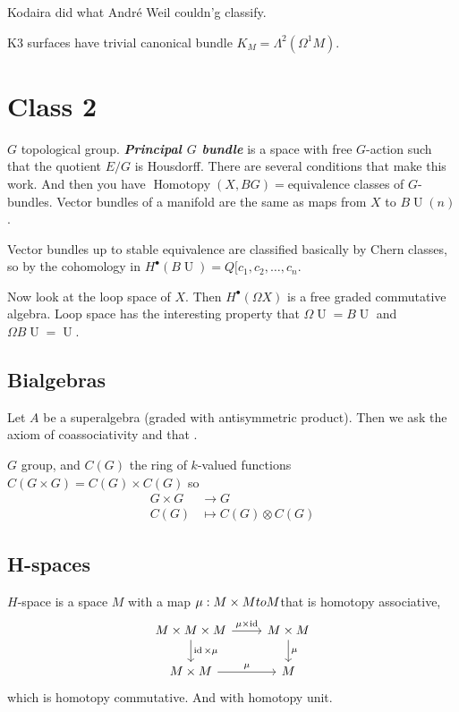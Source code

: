 Kodaira did what Andr\'e Weil couldn'g classify.

 \begin{thm}
	K3 surfaces have trivial canonical bundle $K_{M}=\Lambda^2(\Omega^1M)$.
\end{thm}

\section{Class 2}

$G$ topological group. \textit{\textbf{Principal $G$ bundle}} is a space with free $G$-action such that the quotient $E/G$ is Housdorff. There are several conditions that make this work. And then you have $\operatorname{Homo t o py}(X,BG)=$equivalence classes of $G$-bundles.
Vector bundles of a manifold are the same as maps from $X$ to $B\operatorname{U}(n)$.

Vector bundles up to stable equivalence are classified basically by Chern classes, so by the cohomology in $H^\bullet(B\operatorname{U})=Q[c_1,c_2,\ldots,c_n$.

Now look at the loop space of $X$. Then $H^{\bullet}(\Omega X)$ is a free graded commutative algebra. Loop space has the interesting property that $\Omega \operatorname{U}=B\operatorname{U}$ and $\Omega B\operatorname{U}=\operatorname{U}$.

\subsection{Bialgebras}

Let $A$ be a superalgebra (graded with antisymmetric product). Then we ask the axiom of coassociativity and that .

\begin{example}
	$G$ group, and $C(G)$ the ring of  $k$-valued functions $C(G\times G)=C(G)\times C(G)$ so
	\begin{align*}
		G\times G &\longrightarrow G \\
		C(G) &\longmapsto C(G)\otimes C(G)
	\end{align*}
	
\end{example}

\subsection{H-spaces}

\begin{defn}
	$H$-space is a space $M$ with a map $\mu:M\times M\\to M$that is homotopy associative,
	\[\begin{tikzcd}
		M\times M\times M\arrow[r,"\mu\times \operatorname{id}"]\arrow[d,"\operatorname{id}\times \mu"]&M\times M\arrow[d,"\mu"]\\
		M\times M\arrow[r,"\mu"]&M
	\end{tikzcd}\]
	which is homotopy commutative. And with homotopy unit.
\end{defn}

